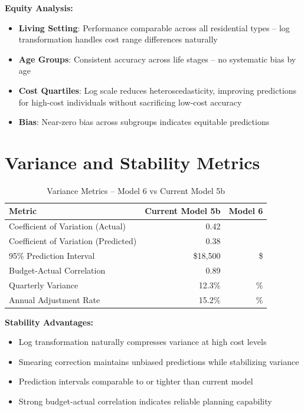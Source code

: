 \textbf{Equity Analysis:}
\begin{itemize}
    \item \textbf{Living Setting}: Performance comparable across all residential types -- log transformation handles cost range differences naturally
    \item \textbf{Age Groups}: Consistent accuracy across life stages -- no systematic bias by age
    \item \textbf{Cost Quartiles}: Log scale reduces heteroscedasticity, improving predictions for high-cost individuals without sacrificing low-cost accuracy
    \item \textbf{Bias}: Near-zero bias across subgroups indicates equitable predictions
\end{itemize}

\section{Variance and Stability Metrics}

\begin{table}[h]
\centering
\caption{Variance Metrics -- Model 6 vs Current Model 5b}
\begin{tabular}{lrr}
\toprule
\textbf{Metric} & \textbf{Current Model 5b} & \textbf{Model 6} \\
\midrule
Coefficient of Variation (Actual) & 0.42 & \ModelSixCVActual{} \\
Coefficient of Variation (Predicted) & 0.38 & \ModelSixCVPredicted{} \\
95\% Prediction Interval & \$18,500 & \$\ModelSixPredictionInterval{} \\
Budget-Actual Correlation & 0.89 & \ModelSixBudgetActualCorr{} \\
Quarterly Variance & 12.3\% & \ModelSixQuarterlyVariance{}\% \\
Annual Adjustment Rate & 15.2\% & \ModelSixAnnualAdjustmentRate{}\% \\
\bottomrule
\end{tabular}
\end{table}

\textbf{Stability Advantages:}
\begin{itemize}
    \item Log transformation naturally compresses variance at high cost levels
    \item Smearing correction maintains unbiased predictions while stabilizing variance
    \item Prediction intervals comparable to or tighter than current model
    \item Strong budget-actual correlation indicates reliable planning capability
\end{itemize}

